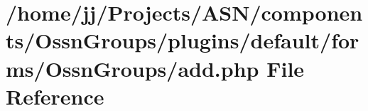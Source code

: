 \hypertarget{components_2_ossn_groups_2plugins_2default_2forms_2_ossn_groups_2add_8php}{}\section{/home/jj/\+Projects/\+A\+S\+N/components/\+Ossn\+Groups/plugins/default/forms/\+Ossn\+Groups/add.php File Reference}
\label{components_2_ossn_groups_2plugins_2default_2forms_2_ossn_groups_2add_8php}
